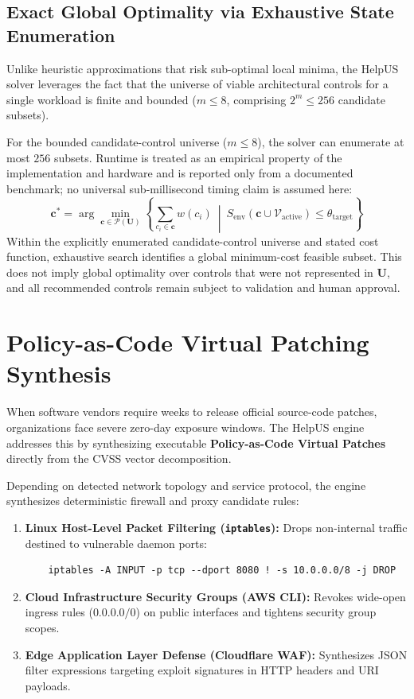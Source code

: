 \subsection{Exact Global Optimality via Exhaustive State Enumeration}
Unlike heuristic approximations that risk sub-optimal local minima, the HelpUS solver leverages the fact that the universe of viable architectural controls for a single workload is finite and bounded ($m \le 8$, comprising $2^m \le 256$ candidate subsets).

For the bounded candidate-control universe ($m \le 8$), the solver can enumerate at most $256$ subsets. Runtime is treated as an empirical property of the implementation and hardware and is reported only from a documented benchmark; no universal sub-millisecond timing claim is assumed here:
\begin{equation}
    \mathbf{c}^* = \arg\min_{\mathbf{c} \in \mathcal{P}(\mathbf{U})} \left\{ \sum_{c_i \in \mathbf{c}} w(c_i) \ \middle|\ S_{\text{env}}(\mathbf{c} \cup \mathcal{V}_{\text{active}}) \le \theta_{\text{target}} \right\}
\end{equation}
Within the explicitly enumerated candidate-control universe and stated cost function, exhaustive search identifies a global minimum-cost feasible subset. This does not imply global optimality over controls that were not represented in $\mathbf{U}$, and all recommended controls remain subject to validation and human approval.

\section{Policy-as-Code Virtual Patching Synthesis}
\label{sec:virtual_patching}
When software vendors require weeks to release official source-code patches, organizations face severe zero-day exposure windows. The HelpUS engine addresses this by synthesizing executable \textbf{Policy-as-Code Virtual Patches} directly from the CVSS vector decomposition.

Depending on detected network topology and service protocol, the engine synthesizes deterministic firewall and proxy candidate rules:
\begin{enumerate}
    \item \textbf{Linux Host-Level Packet Filtering (\texttt{iptables}):} Drops non-internal traffic destined to vulnerable daemon ports:
    \begin{verbatim}
    iptables -A INPUT -p tcp --dport 8080 ! -s 10.0.0.0/8 -j DROP
    \end{verbatim}
    \item \textbf{Cloud Infrastructure Security Groups (AWS CLI):} Revokes wide-open ingress rules ($0.0.0.0/0$) on public interfaces and tightens security group scopes.
    \item \textbf{Edge Application Layer Defense (Cloudflare WAF):} Synthesizes JSON filter expressions targeting exploit signatures in HTTP headers and URI payloads.
\end{enumerate}

